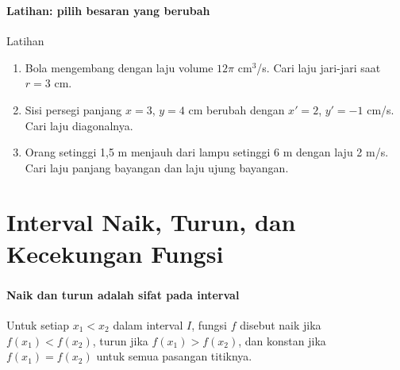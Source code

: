 \documentclass{../../kalkulus-ppt}
\begin{document}
\begin{frame}
\frametitle{\insertsection}
\framesubtitle{Latihan: pilih besaran yang berubah}

\begin{exampleblock}{Latihan}
\begin{enumerate}
\item Bola mengembang dengan laju volume $12\pi$ cm$^3$/s. Cari laju jari-jari saat $r=3$ cm.
\item Sisi persegi panjang $x=3$, $y=4$ cm berubah dengan $x'=2$, $y'=-1$ cm/s. Cari laju diagonalnya.
\item Orang setinggi 1,5 m menjauh dari lampu setinggi 6 m dengan laju 2 m/s. Cari laju panjang bayangan dan laju ujung bayangan.
\end{enumerate}
\end{exampleblock}
\end{frame}

\section{Interval Naik, Turun, dan Kecekungan Fungsi}

\begin{frame}
\frametitle{\insertsection}
\framesubtitle{Naik dan turun adalah sifat pada interval}

\begin{definisi}
Untuk setiap $x_1<x_2$ dalam interval $I$, fungsi $f$ disebut naik jika $f(x_1)<f(x_2)$, turun jika $f(x_1)>f(x_2)$, dan konstan jika $f(x_1)=f(x_2)$ untuk semua pasangan titiknya.
\end{definisi}
\end{frame}
\end{document}

